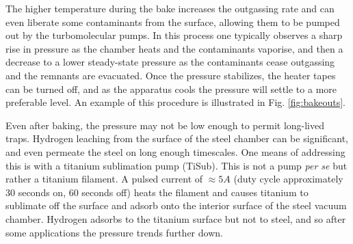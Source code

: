 	

		The higher temperature during the bake increases the outgassing rate and can even liberate some contaminants from the surface, allowing them to be pumped out by the turbomolecular pumps.
		In this process one typically observes a sharp rise in pressure as the chamber heats and the contaminants vaporise, and then a decrease to a lower steady-state pressure as the contaminants cease outgassing and the remnants are evacuated.
		Once the pressure stabilizes, the heater tapes can be turned off, and as the apparatus cools the pressure will settle to a more preferable level.
		An example of this procedure is illustrated in Fig.	\ref{fig:bakeouts}.
		
		Even after baking, the pressure may not be low enough to permit long-lived traps.
		Hydrogen leaching from the surface of the steel chamber can be significant, and even permeate the steel on long enough timescales.
		One means of addressing this is with a titanium sublimation pump (TiSub).
		This is not a pump \emph{per se} but rather a titanium filament.
		A pulsed current of $\approx5A$ (duty cycle approximately 30 seconds on, 60 seconds off) heats the filament and causes titanium to sublimate off the surface and adsorb onto the interior surface of the steel vacuum chamber.
		Hydrogen adsorbs to the titanium surface but not to steel, and so after some applications the pressure trends further down.
	
	
		

